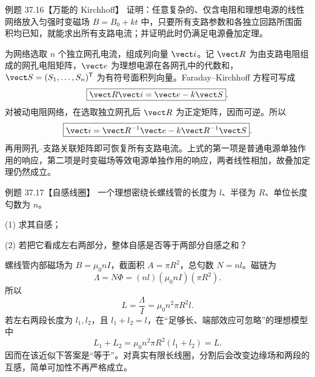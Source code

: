 \Needspace{0.12\textheight}
\begin{origexamplebox}{例题 37.16【万能的 Kirchhoff】}
证明：任意复杂的、仅含电阻和理想电源的线性网络放入匀强时变磁场 $B=B_0+kt$ 中，只要所有支路参数和各独立回路所围面积均已知，就能求出所有支路电流；并证明此时仍满足电源叠加定理。
\end{origexamplebox}

\begin{xesolution}
为网络选取 $n$ 个独立网孔电流，组成列向量 $\vect i$。记 $\vect R$ 为由支路电阻组成的网孔电阻矩阵，$\vect e$ 为理想电源在各网孔中的代数和，
$\vect S=(S_1,\ldots,S_n)^{\mathsf T}$ 为有符号面积列向量。Faraday--Kirchhoff 方程可写成
\begin{equation}
  \boxed{\vect R\vect i=\vect e-k\vect S}.
\end{equation}
对被动电阻网络，在选取独立网孔后 $\vect R$ 为正定矩阵，因而可逆。所以
\begin{equation}
  \boxed{\vect i=\vect R^{-1}\vect e-k\vect R^{-1}\vect S}.
\end{equation}
再用网孔--支路关联矩阵即可恢复所有支路电流。上式的第一项是普通电源单独作用的响应，第二项是时变磁场等效电源单独作用的响应，两者线性相加，故叠加定理仍然成立。
\end{xesolution}

\Needspace{0.12\textheight}
\begin{origexamplebox}{例题 37.17【自感线圈】}
一个理想密绕长螺线管的长度为 $l$、半径为 $R$、单位长度匂数为 $n$。

(1) 求其自感；

(2) 若把它看成左右两部分，整体自感是否等于两部分自感之和？
\end{origexamplebox}

\begin{xesolution}
螺线管内部磁场为 $B=\mu_0nI$，截面积 $A=\pi R^2$，总匂数 $N=nl$。磁链为
\begin{equation}
  \Lambda=N\Phi=(nl)(\mu_0nI)(\pi R^2).
\end{equation}
所以
\begin{equation}
  \boxed{L=\frac\Lambda I=\mu_0n^2\pi R^2l}.
\end{equation}
若左右两段长度为 $l_1,l_2$，且 $l_1+l_2=l$，在“足够长、端部效应可忽略”的理想模型中
\begin{equation}
  L_1+L_2=\mu_0n^2\pi R^2(l_1+l_2)=L.
\end{equation}
因而在该近似下答案是“等于”。对真实有限长线圈，分割后会改变边缘场和两段的互感，简单可加性不再严格成立。

\solenoidSplitDiagram
\end{xesolution}

